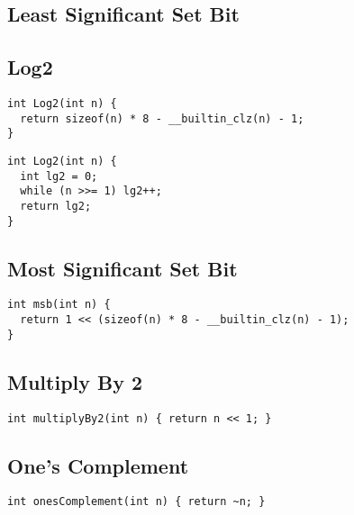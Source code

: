 \documentclass[twoside]{article}
\begin{document}
\subsection*{Least Significant Set Bit}

\begin{multicols*}{2}
\subsectionfont{\large\bfseries\sffamily\underline}
\subsection*{Log2}
\begin{verbatim}
int Log2(int n) {
  return sizeof(n) * 8 - __builtin_clz(n) - 1;
}
\end{verbatim}
\vspace{-12pt}
\begin{verbatim}
int Log2(int n) {
  int lg2 = 0;
  while (n >>= 1) lg2++;
  return lg2;
}
\end{verbatim}

\subsectionfont{\large\bfseries\sffamily\underline}
\subsection*{Most Significant Set Bit}
\begin{verbatim}
int msb(int n) {
  return 1 << (sizeof(n) * 8 - __builtin_clz(n) - 1);
}
\end{verbatim}

\subsectionfont{\large\bfseries\sffamily\underline}
\subsection*{Multiply By 2}
\begin{verbatim}
int multiplyBy2(int n) { return n << 1; }
\end{verbatim}

\subsectionfont{\large\bfseries\sffamily\underline}
\subsection*{One's Complement}
\begin{verbatim}
int onesComplement(int n) { return ~n; }
\end{verbatim}


\end{multicols*}
\end{document}
